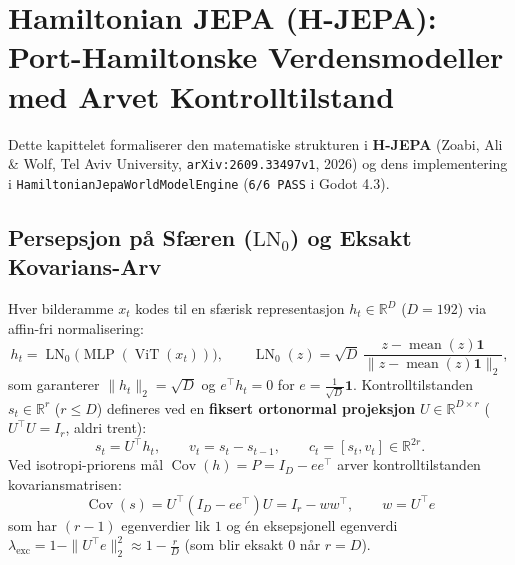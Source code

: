 \documentclass[11pt,a4paper,oneside]{book}
\theoremstyle{definition}
\begin{document}
\chapter{Hamiltonian JEPA (H-JEPA): Port-Hamiltonske Verdensmodeller med Arvet Kontrolltilstand}

Dette kapittelet formaliserer den matematiske strukturen i \textbf{H-JEPA} (Zoabi, Ali \& Wolf, Tel Aviv University, \texttt{arXiv:2609.33497v1}, 2026) og dens implementering i \texttt{HamiltonianJepaWorldModelEngine} (\texttt{6/6 PASS} i Godot 4.3).

\section{Persepsjon på Sfæren ($\text{LN}_0$) og Eksakt Kovarians-Arv}
Hver bilderamme $x_t$ kodes til en sfærisk representasjon $h_t \in \mathbb{R}^D$ ($D=192$) via affin-fri normalisering:
\begin{equation}
h_t = \operatorname{LN}_0\!\big(\operatorname{MLP}(\operatorname{ViT}(x_t))\big), \qquad \operatorname{LN}_0(z) = \sqrt{D}\,\frac{z - \operatorname{mean}(z)\mathbf{1}}{\|z - \operatorname{mean}(z)\mathbf{1}\|_2},
\end{equation}
som garanterer $\|h_t\|_2 = \sqrt{D}$ og $e^\top h_t = 0$ for $e = \frac{1}{\sqrt{D}}\mathbf{1}$. Kontrolltilstanden $s_t \in \mathbb{R}^r$ ($r \le D$) defineres ved en \textbf{fiksert ortonormal projeksjon} $U \in \mathbb{R}^{D\times r}$ ($U^\top U = I_r$, aldri trent):
\begin{equation}
s_t = U^\top h_t, \qquad v_t = s_t - s_{t-1}, \qquad c_t = [s_t, v_t] \in \mathbb{R}^{2r}.
\end{equation}
Ved isotropi-priorens mål $\operatorname{Cov}(h) = P = I_D - ee^\top$ arver kontrolltilstanden kovariansmatrisen:
\begin{equation}
\boxed{\operatorname{Cov}(s) = U^\top(I_D - ee^\top)U = I_r - ww^\top, \qquad w = U^\top e}
\end{equation}
som har $(r-1)$ egenverdier lik $1$ og én eksepsjonell egenverdi $\lambda_{\text{exc}} = 1 - \|U^\top e\|_2^2 \approx 1 - \frac{r}{D}$ (som blir eksakt $0$ når $r = D$).
\end{document}
